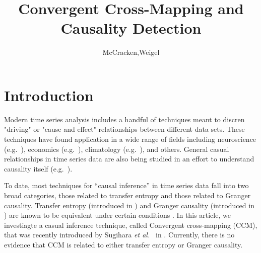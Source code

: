 \documentclass[a4paper,11pt]{article}
\title{Convergent Cross-Mapping and Causality Detection}
\author{McCracken,Weigel}
\begin{document}
\maketitle


\section{Introduction}
Modern time series analysis includes a handful of techniques meant to discren "driving" or "cause and effect" relationships between different data sets.  These techniques have found application in a wide range of fields including neuroscience (e.g.\ \cite{Kaminski2001}), economics (e.g.\ \cite{dufour1998,dufour2006}), climatology (e.g.\ \cite{mosedale2006}), and others.  General casual relationships in time series data are also being studied in an effort to understand causality itself (e.g.\ \cite{eichler2012}).  

To date, most techniques for ``causal inference'' in time series data fall into two broad categories, those related to transfer entropy and those related to Granger causality.  Transfer entropy (introduced in \cite{Schreiber2000}) and Granger causality (introduced in \cite{granger1969}) are known to be equivalent under certain conditions \cite{Barnett2009}.  In this article, we investiagte a casual inference technique, called Convergent cross-mapping (CCM), that was recently introduced by Sugihara {\em et al.\ } in \cite{Sugihara2012}.  Currently, there is no evidence that CCM is related to either transfer entropy or Granger causality.
\end{document}
